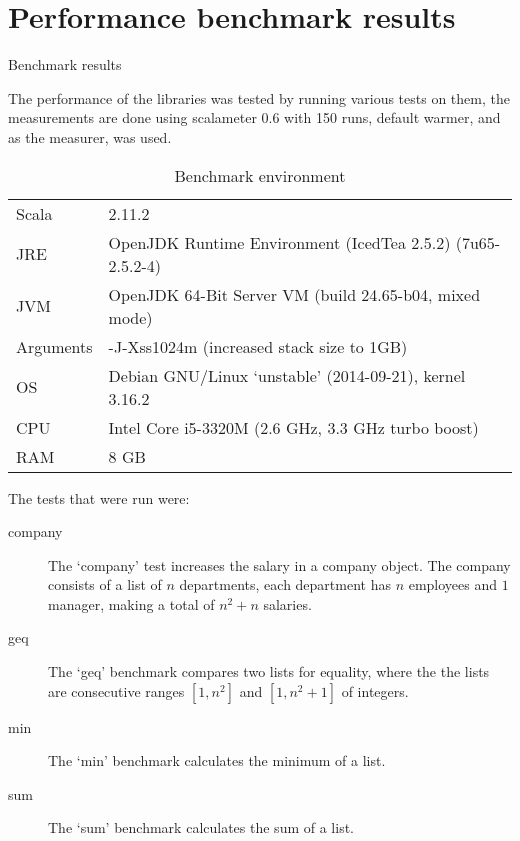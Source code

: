 \section{Performance benchmark results}

\begin{table}[ht]

\caption{Benchmark results}
\label{bench}
\end{table}

The performance of the libraries was tested by running various tests on them,
the measurements are done using scalameter 0.6 with 150 runs, default warmer,
and as the measurer, 
was used.

\begin{table}[ht]
\begin{tabular}{l|l}
    Scala & 2.11.2 \\
    JRE   & OpenJDK Runtime Environment (IcedTea 2.5.2) (7u65-2.5.2-4) \\
    JVM   & OpenJDK 64-Bit Server VM (build 24.65-b04, mixed mode) \\
    Arguments & -J-Xss1024m (increased stack size to 1GB) \\
    OS    & Debian GNU/Linux `unstable' (2014-09-21), kernel 3.16.2 \\\hline
    CPU   & Intel Core i5-3320M (2.6 GHz, 3.3 GHz turbo boost) \\
    RAM   & 8 GB
\end{tabular}
\caption{Benchmark environment}
\end{table}

The tests that were run were:

\begin{description}
    \item[company]The `company' test increases the salary in a company
object. The company consists of a list of $n$ departments, each department has
$n$ employees and $1$ manager, making a total of $n^{2} + n$ salaries.

    \item[geq] The `geq' benchmark compares two lists for equality, where the
               the lists are consecutive ranges $[1, n^{2}]$ and $[1, n^{2} +1]$ of
               integers.

    \item[min] The `min' benchmark calculates the minimum of a list.

    \item[sum] The `sum' benchmark calculates the sum of a list.
\end{description}

